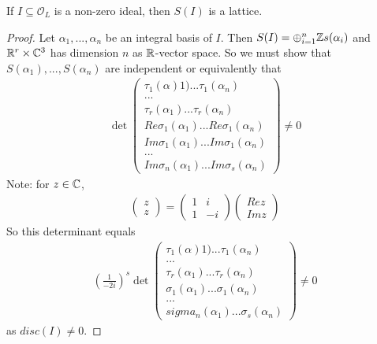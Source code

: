 \documentclass[a4paper]{article}
\begin{document}
\begin{lemma}
If $I \subseteq \mathcal{O}_L$ is a non-zero ideal, then $S(I)$ is a lattice.
\begin{proof}
Let $\alpha_1,...,\alpha_n$ be an integral basis of $I$. Then $S(I) = \oplus_{i=1}^n \mathbb{Z} s(\alpha_i)$ and $\mathbb{R}^r \times \mathbb{C}^3$ has dimension $n$ as $\mathbb{R}$-vector space. So we must show that $S(\alpha_1),...,S(\alpha_n)$ are independent or equivalently that
\begin{equation*}
\begin{aligned}
\det \begin{pmatrix}
\tau_1 (\alpha)1) ... \tau_1(\alpha_n)\\
...\\
\tau_r(\alpha_1) ... \tau_r(\alpha_n)\\
Re \sigma_1 (\alpha_1)...Re \sigma_1(\alpha_n)\\
Im \sigma_1 (\alpha_1)...Im \sigma_1(\alpha_n)\\
...\\
Im \sigma_n (\alpha_1)...Im \sigma_s(\alpha_n)
\end{pmatrix} \neq 0
\end{aligned}
\end{equation*}
Note: for $z \in \mathbb{C}$,
\begin{equation*}
\begin{aligned}
\begin{pmatrix}
z\\
z
\end{pmatrix} = 
\begin{pmatrix}
1 & i\\
1 & -i
\end{pmatrix}
\begin{pmatrix}
Re z\\
Im z
\end{pmatrix}
\end{aligned}
\end{equation*}
So this determinant equals
\begin{equation*}
\begin{aligned}
(\frac{1}{-2i})^s  \det \begin{pmatrix}
\tau_1 (\alpha)1) ... \tau_1(\alpha_n)\\
...\\
\tau_r(\alpha_1) ... \tau_r(\alpha_n)\\
\sigma_1 (\alpha_1)...\sigma_1(\alpha_n)\\
...\\
sigma_n (\alpha_1)...\sigma_s(\alpha_n)
\end{pmatrix} \neq 0
\end{aligned}
\end{equation*}
as $disc(I) \neq 0$.
\end{proof}
\end{lemma}
\end{document}
